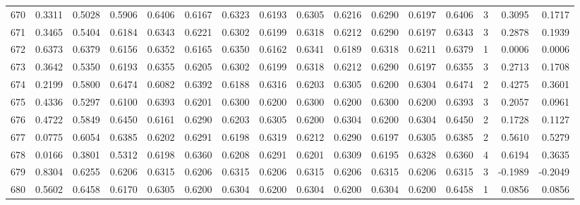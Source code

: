 \begin{tabular}{lrrrrrrrrrrrrrrr}
670 &      0.3311 &  0.5028 &  0.5906 &  0.6406 &  0.6167 &  0.6323 &  0.6193 &  0.6305 &  0.6216 &  0.6290 &   0.6197 &     0.6406 &      3 &                    0.3095 &                     0.1717 \\
671 &      0.3465 &  0.5404 &  0.6184 &  0.6343 &  0.6221 &  0.6302 &  0.6199 &  0.6318 &  0.6212 &  0.6290 &   0.6197 &     0.6343 &      3 &                    0.2878 &                     0.1939 \\
672 &      0.6373 &  0.6379 &  0.6156 &  0.6352 &  0.6165 &  0.6350 &  0.6162 &  0.6341 &  0.6189 &  0.6318 &   0.6211 &     0.6379 &      1 &                    0.0006 &                     0.0006 \\
673 &      0.3642 &  0.5350 &  0.6193 &  0.6355 &  0.6205 &  0.6302 &  0.6199 &  0.6318 &  0.6212 &  0.6290 &   0.6197 &     0.6355 &      3 &                    0.2713 &                     0.1708 \\
674 &      0.2199 &  0.5800 &  0.6474 &  0.6082 &  0.6392 &  0.6188 &  0.6316 &  0.6203 &  0.6305 &  0.6200 &   0.6304 &     0.6474 &      2 &                    0.4275 &                     0.3601 \\
675 &      0.4336 &  0.5297 &  0.6100 &  0.6393 &  0.6201 &  0.6300 &  0.6200 &  0.6300 &  0.6200 &  0.6300 &   0.6200 &     0.6393 &      3 &                    0.2057 &                     0.0961 \\
676 &      0.4722 &  0.5849 &  0.6450 &  0.6161 &  0.6290 &  0.6203 &  0.6305 &  0.6200 &  0.6304 &  0.6200 &   0.6304 &     0.6450 &      2 &                    0.1728 &                     0.1127 \\
677 &      0.0775 &  0.6054 &  0.6385 &  0.6202 &  0.6291 &  0.6198 &  0.6319 &  0.6212 &  0.6290 &  0.6197 &   0.6305 &     0.6385 &      2 &                    0.5610 &                     0.5279 \\
678 &      0.0166 &  0.3801 &  0.5312 &  0.6198 &  0.6360 &  0.6208 &  0.6291 &  0.6201 &  0.6309 &  0.6195 &   0.6328 &     0.6360 &      4 &                    0.6194 &                     0.3635 \\
679 &      0.8304 &  0.6255 &  0.6206 &  0.6315 &  0.6206 &  0.6315 &  0.6206 &  0.6315 &  0.6206 &  0.6315 &   0.6206 &     0.6315 &      3 &                   -0.1989 &                    -0.2049 \\
680 &      0.5602 &  0.6458 &  0.6170 &  0.6305 &  0.6200 &  0.6304 &  0.6200 &  0.6304 &  0.6200 &  0.6304 &   0.6200 &     0.6458 &      1 &                    0.0856 &                     0.0856 \\

\end{tabular}
